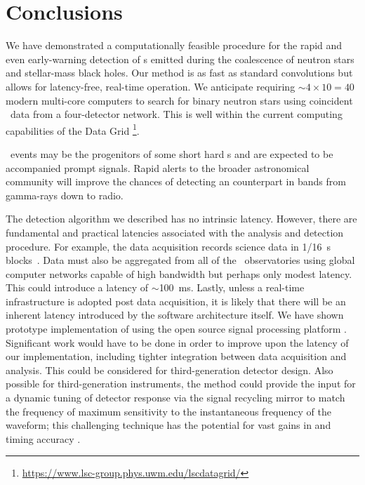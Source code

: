 \section{Conclusions}
\label{sec:conclusions}

We have demonstrated a computationally feasible procedure for the rapid and
even early-warning detection of \GW{}s emitted during the coalescence
of neutron stars and stellar-mass black holes. Our method is as fast as
standard \fft{} convolutions but allows for latency-free, real-time
operation.  We anticipate requiring $\sim 4 \times 10 = 40$ modern multi-core computers to
search for binary neutron stars using coincident \GW\ data from a four-detector network.
This is well within the current computing capabilities of the \LIGO{} Data Grid%
\footnote{\url{https://www.lsc-group.phys.uwm.edu/lscdatagrid/}}.

\CBC\ events may be the progenitors of some short hard \GRB{}s and are
expected to be accompanied prompt \EM{} signals.  Rapid
alerts to the broader astronomical community will improve the chances of
detecting an \EM{} counterpart in bands from gamma-rays down to
radio.

The detection algorithm we described has no intrinsic latency.  However, there are
fundamental and practical latencies associated with the analysis and detection
procedure. For example, the \LIGO{} data acquisition records science data in 1/16~s
blocks~\citep{Bork2001}. Data must also be aggregated from all of the \GW\
observatories using global computer networks capable of high bandwidth but perhaps only
modest latency.  This could introduce a latency of $\sim$100~ms.  Lastly, unless a
real-time infrastructure is adopted post data acquisition, it is likely that there will be 
an inherent latency introduced by the software architecture itself.  We have shown 
prototype implementation of \lloid{} using the open source signal processing platform
\gstreamer. Significant work would have to be done in order to
improve upon the latency of our implementation, including tighter integration between
data acquisition and analysis. This could be considered for third-generation detector
design.
Also possible for third-generation instruments, the \lloid{} method could
provide the input for a dynamic tuning of detector response via the signal
recycling mirror to match the frequency of maximum sensitivity to the
instantaneous frequency of the \GW{} waveform; this challenging technique has
the potential for vast gains in \SNR{} and timing accuracy
\citep{PhysRevD.47.2184}.

